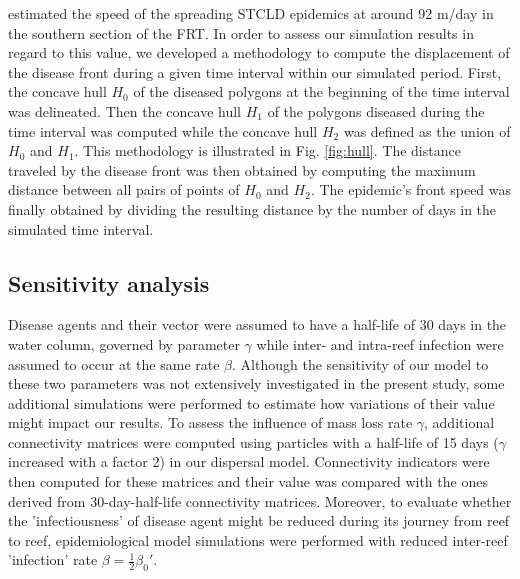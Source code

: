 \cite{muller2020spatial} estimated the speed of the spreading STCLD epidemics at around 92 m/day in the southern section of the FRT. In order to assess our simulation results in regard to this value, we developed a methodology to compute the displacement of the disease front during a given time interval within our simulated period. First, the concave hull $H_0$ of the diseased polygons at the beginning of the time interval was delineated. Then the concave hull $H_1$ of the polygons diseased during the time interval was computed while the concave hull $H_2$ was defined as the union of $H_0$ and $H_1$. This methodology is illustrated in Fig. \ref{fig:hull}. The distance traveled by the disease front was then obtained by computing the maximum distance between all pairs of points of $H_0$ and $H_2$. The epidemic's front speed was finally obtained by dividing the resulting distance by the number of days in the simulated time interval.

\subsection{Sensitivity analysis}
Disease agents and their vector were assumed to have a half-life of 30 days in the water column, governed by parameter $\gamma$ while inter- and intra-reef infection were assumed to occur at the same rate $\beta$. Although the sensitivity of our model to these two parameters was not extensively investigated in the present study, some additional simulations were performed to estimate how variations of their value might impact our results. To assess the influence of mass loss rate $\gamma$, additional connectivity matrices were computed using particles with a half-life of 15 days ($\gamma$ increased with a factor 2) in our dispersal model. Connectivity indicators were then computed for these matrices and their value was compared with the ones derived from 30-day-half-life connectivity matrices. Moreover, to evaluate whether the 'infectiousness' of disease agent might be reduced during its journey from reef to reef, epidemiological model simulations were performed with reduced inter-reef 'infection' rate $\beta=\frac{1}{2}\beta_0'$.

